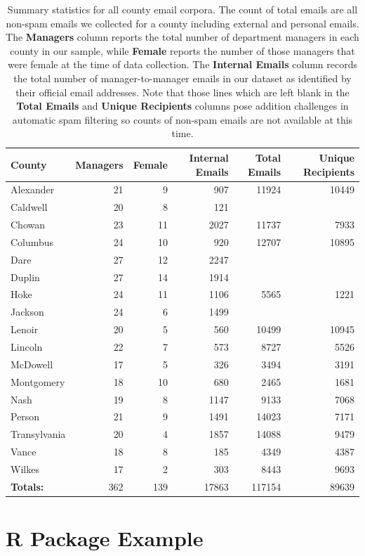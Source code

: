 \documentclass[fleqn]{MJDArticle}
\begin{document}
%
%
\begin{table}[ht]
\caption{\label{tab:county email summaries} Summary statistics for all county email corpora. The count of total emails are all non-spam emails we collected for a county including external and personal emails. The \textbf{Managers} column reports the total number of department managers in each county in our sample, while \textbf{Female} reports the number of those managers that were female at the time of data collection. The \textbf{Internal Emails} column records the total number of manager-to-manager emails in our dataset as identified by their official email addresses. Note that those lines which are left blank in the \textbf{Total Emails} and \textbf{Unique Recipients} columns pose addition challenges in automatic spam filtering so counts of non-spam emails are not available at this time.  }
\centering
\begin{tabular}{lrrrrr}
  \hline
 \textbf{County} & \textbf{Managers} & \textbf{Female} & \textbf{Internal Emails} &\textbf{Total Emails} & \textbf{Unique Recipients} \\
  \hline
  \rowcolor{Grey}
Alexander & 21 & 9 & 907 & 11924 & 10449 \\
Caldwell & 20 & 8 & 121 &  &  \\
\rowcolor{Grey}
Chowan & 23 & 11 & 2027 & 11737 & 7933 \\
Columbus & 24 & 10 & 920 & 12707 & 10895 \\
\rowcolor{Grey}
Dare & 27 & 12 & 2247 &  &  \\
Duplin & 27 & 14 & 1914 &  &  \\
\rowcolor{Grey}
Hoke & 24 & 11 & 1106 & 5565 & 1221 \\
Jackson & 24 & 6 & 1499 &  &  \\
\rowcolor{Grey}
Lenoir & 20 & 5 & 560 & 10499 & 10945 \\
Lincoln & 22 & 7 & 573 & 8727 & 5526 \\
\rowcolor{Grey}
McDowell & 17 & 5 & 326 & 3494 & 3191 \\
Montgomery & 18 & 10 & 680 & 2465 & 1681 \\
\rowcolor{Grey}
Nash & 19 & 8 & 1147 & 9133 & 7068 \\
Person & 21 & 9 & 1491 & 14023 & 7171 \\
\rowcolor{Grey}
Transylvania & 20 & 4 & 1857 & 14088 & 9479 \\
Vance & 18 & 8 & 185 & 4349 & 4387 \\
\rowcolor{Grey}
Wilkes & 17 & 2 & 303 & 8443 & 9693 \\
   \hline
   \textbf{Totals:} & 362 & 139 & 17863 & 117154 & 89639 \\
   \hline
\end{tabular}
\end{table}


\section{R Package Example}
\hypersetup{linkcolor=black}


 
 
\end{document}

